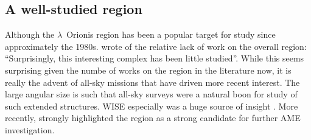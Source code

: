   \subsection{A well-studied region}
    Although the $\lambda$~Orionis region has been a popular target for study since approximately the 1980s. \cite{duerr82} wrote of the relative lack of work on the overall region: ``Surprisingly, this interesting complex has been little studied''. While this seems surprising given the numbe of works on the region in the literature now, it is really the advent of all-sky missions that have driven more recent interest.  The large angular size is such that all-sky surveys were a natural boon for study of such extended structures. WISE especially was a huge source of insight \citep{koenig15}. More recently, \cite{planck15XXV} strongly highlighted the region as a strong candidate for further AME investigation.

